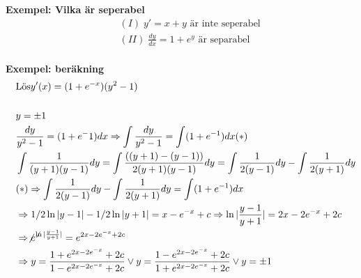 \documentclass{article}
\begin{document}
\textbf{Exempel: Vilka är seperabel}
\begin{align*}
  &\quad  (I) \; y'=x+y \text{ är inte seperabel}  \\
  &\quad  (II) \; \frac{dy}{dx} = 1 + e^y \text{ är separabel} \\ 
\end{align*}

\textbf{Exempel: beräkning}  
\begin{align*}
  &\quad  \text{Lös} y'(x)=(1+e^{-x})(y^2-1) \\
  &\quad  \\
  &\quad  y=\pm1 \\
  &\quad  \frac{dy}{y^2-1}=(1+e^-1)dx  \Rightarrow \int \frac{dy}{y^2-1}= \int (1+e^{-1})dx (*)\\
  &\quad  \int \frac{1}{(y+1)(y-1)}dy = \int \frac{((y+1)-(y-1))}{2(y+1)(y-1)}dy
  = \int \frac{1}{2(y-1)}dy - \int \frac{1}{2(y+1)}dy \\
  &\quad  (*) \Rightarrow  \int \frac{1}{2(y-1)}dy - \int \frac{1}{2(y+1)}dy = \int (1+e^{-1})dx \\
  &\quad  \Rightarrow 1/2 \ln|y-1| - 1/2 \ln|y+1| = x-e^{-x} +c
  \Rightarrow \ln|\frac{y-1}{y+1}| = 2x-2e^{-x}+2c \\
  &\quad  \Rightarrow \not{e}^{\not\ln|\frac{y-1}{y+1}|} = e^{2x-2e^{-x}+2c} \\
  &\quad  \Rightarrow y = \frac{1+e^{2x-2e^{-x}}+2c}{{1-e^{2x-2e^{-x}}+2c}} \lor
  y=\frac{1-e^{2x-2e^{-x}}+2c}{{1+e^{2x-2e^{-x}}+2c}} \lor y=\pm1
\end{align*}


\newpage
\end{document}
